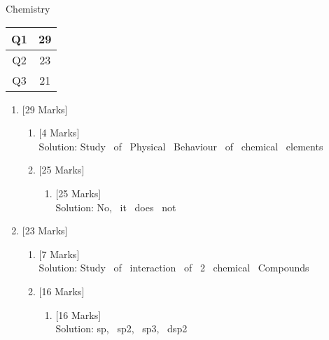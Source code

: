 \documentclass[10pt]{article}
\begin{document}
\vspace*{2cm}
\begin{center}
Chemistry
\\\vspace*{1cm}
\begin{tabular}{|c|c|}
\hline Q1 & 29 \\ \hline Q2 & 23 \\ \hline Q3 & 21 \\ \hline \end{tabular}\end{center}
\begin{enumerate}\item {}\hfill
[29 Marks]
\begin{enumerate}\item {}\hfill
[4 Marks]
\\Solution: Study \ of \ Physical \ Behaviour \ of \ chemical \ elements\\\vspace*{10pt}\item {}\hfill
[25 Marks]
\begin{enumerate}\item {}\hfill
[25 Marks]
\\Solution: No, \ it \ does \ not\\\vspace*{10pt}\end{enumerate}
\end{enumerate}
\item {}\hfill
[23 Marks]
\begin{enumerate}\item {}\hfill
[7 Marks]
\\Solution: Study \ of \ interaction \ of \ 2 \ chemical \ Compounds\\\vspace*{10pt}\item {}\hfill
[16 Marks]
\begin{enumerate}\item {}\hfill
[16 Marks]
\\Solution: sp, \ sp2, \ sp3, \ dsp2\\\vspace*{10pt}\end{enumerate}

\end{enumerate}
\end{enumerate}
\end{document}
